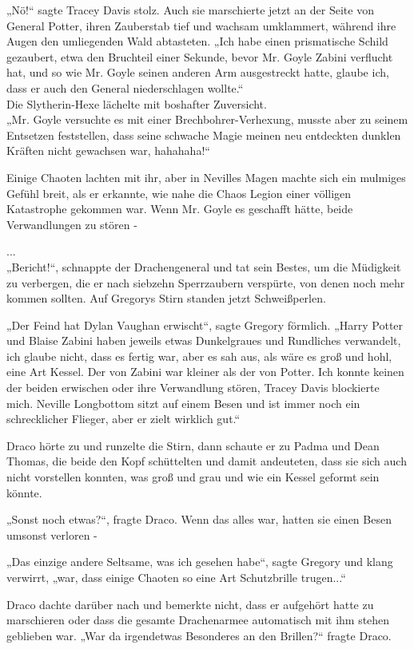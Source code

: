 {„Nö!“ sagte Tracey Davis stolz. Auch sie marschierte jetzt an der Seite von General Potter, ihren Zauberstab tief und wachsam umklammert, während ihre Augen den umliegenden Wald abtasteten. „Ich habe einen prismatische Schild gezaubert, etwa den Bruchteil einer Sekunde, bevor Mr. Goyle Zabini verflucht hat, und so wie Mr. Goyle seinen anderen Arm ausgestreckt hatte, glaube ich, dass er auch den General niederschlagen wollte.“\\ Die Slytherin-Hexe lächelte mit boshafter Zuversicht.\\ „Mr. Goyle versuchte es mit einer Brechbohrer-Verhexung, musste aber zu seinem Entsetzen feststellen, dass seine schwache Magie meinen neu entdeckten dunklen Kräften nicht gewachsen war, hahahaha!“

Einige Chaoten lachten mit ihr, aber in Nevilles Magen machte sich ein mulmiges Gefühl breit, als er erkannte, wie nahe die Chaos Legion einer völligen Katastrophe gekommen war. Wenn Mr. Goyle es geschafft hätte, beide Verwandlungen zu stören -

...\\ „Bericht!“, schnappte der Drachengeneral und tat sein Bestes, um die Müdigkeit zu verbergen, die er nach siebzehn Sperrzaubern verspürte, von denen noch mehr kommen sollten. Auf Gregorys Stirn standen jetzt Schweißperlen.

„Der Feind hat Dylan Vaughan erwischt“, sagte Gregory förmlich. „Harry Potter und Blaise Zabini haben jeweils etwas Dunkelgraues und Rundliches verwandelt, ich glaube nicht, dass es fertig war, aber es sah aus, als wäre es groß und hohl, eine Art Kessel. Der von Zabini war kleiner als der von Potter. Ich konnte keinen der beiden erwischen oder ihre Verwandlung stören, Tracey Davis blockierte mich. Neville Longbottom sitzt auf einem Besen und ist immer noch ein schrecklicher Flieger, aber er zielt wirklich gut.“

Draco hörte zu und runzelte die Stirn, dann schaute er zu Padma und Dean Thomas, die beide den Kopf schüttelten und damit andeuteten, dass sie sich auch nicht vorstellen konnten, was groß und grau und wie ein Kessel geformt sein könnte.

„Sonst noch etwas?“, fragte Draco. Wenn das alles war, hatten sie einen Besen umsonst verloren -

„Das einzige andere Seltsame, was ich gesehen habe“, sagte Gregory und klang verwirrt, „war, dass einige Chaoten so eine Art Schutzbrille trugen...“

Draco dachte darüber nach und bemerkte nicht, dass er aufgehört hatte zu marschieren oder dass die gesamte Drachenarmee automatisch mit ihm stehen geblieben war. „War da irgendetwas Besonderes an den Brillen?“ fragte Draco.

}
